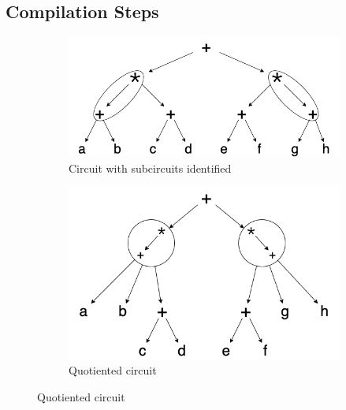\subsection{Compilation Steps}
\begin{figure}
    \begin{subfigure}{0.4\columnwidth}
        \includegraphics[width=0.9\linewidth]{figures/compilation_overview/running_example_quotiented.drawio.png}
        \caption{Circuit with subcircuits identified}
        \label{fig:subcircuits-identified}
    \end{subfigure}
    \begin{subfigure}{0.4\columnwidth}
        \includegraphics[width=0.9\linewidth]{figures/compilation_overview/running_example_identified.drawio.png}
        \caption{Quotiented circuit}
        \label{fig:quotiented-circuit}
        

\end{subfigure}
\end{figure}
